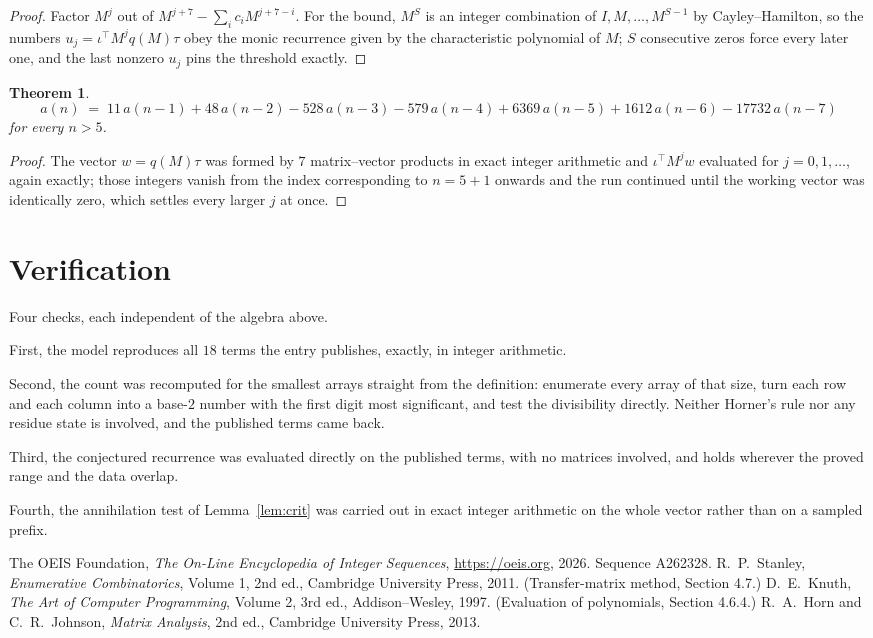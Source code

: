 \documentclass[11pt,a4paper]{article}
\theoremstyle{plain}
\newtheorem{theorem}{Theorem}
\theoremstyle{definition}
\begin{document}
\begin{proof}
Factor $M^{j}$ out of $M^{j+7}-\sum_ic_iM^{j+7-i}$. For the bound, $M^{S}$
is an integer combination of $I,M,\dots,M^{S-1}$ by Cayley--Hamilton, so the numbers
$u_j=\iota^{\!\top}M^{j}q(M)\tau$ obey the monic recurrence given by the characteristic
polynomial of $M$; $S$ consecutive zeros force every later one, and the last nonzero $u_j$
pins the threshold exactly.
\end{proof}

\begin{theorem}
\[
a(n)\;=\;11\,a(n-1) + 48\,a(n-2) - 528\,a(n-3) - 579\,a(n-4) + 6369\,a(n-5) + 1612\,a(n-6) - 17732\,a(n-7)
\]
for every $n>5$.
\end{theorem}

\begin{proof}
The vector $w=q(M)\tau$ was formed by $7$ matrix--vector products in exact integer
arithmetic and $\iota^{\!\top}M^{j}w$ evaluated for $j=0,1,\dots$, again exactly; those
integers vanish from the index corresponding to $n=5+1$ onwards and the run continued
until the working vector was identically zero, which settles every larger $j$ at once.
\end{proof}

\section{Verification}

Four checks, each independent of the algebra above.

First, the model reproduces all $18$ terms the entry publishes, exactly, in integer
arithmetic.

Second, the count was recomputed for the smallest arrays straight from the definition:
enumerate every array of that size, turn each row and each column into a base-$2$ number with
the first digit most significant, and test the divisibility directly. Neither Horner's rule nor
any residue state is involved, and the published terms came back.

Third, the conjectured recurrence was evaluated directly on the published terms, with no
matrices involved, and holds wherever the proved range and the data overlap.

Fourth, the annihilation test of Lemma~\ref{lem:crit} was carried out in exact integer
arithmetic on the whole vector rather than on a sampled prefix.

\begin{thebibliography}{9}
 The OEIS Foundation, \emph{The On-Line Encyclopedia of Integer
Sequences}, \url{https://oeis.org}, 2026. Sequence A262328.
 R.~P.~Stanley, \emph{Enumerative Combinatorics}, Volume 1, 2nd ed.,
Cambridge University Press, 2011. (Transfer-matrix method, Section 4.7.)
 D.~E.~Knuth, \emph{The Art of Computer Programming}, Volume 2, 3rd ed.,
Addison--Wesley, 1997. (Evaluation of polynomials, Section 4.6.4.)
 R.~A.~Horn and C.~R.~Johnson, \emph{Matrix Analysis}, 2nd ed., Cambridge
University Press, 2013.
\end{thebibliography}
\end{document}
